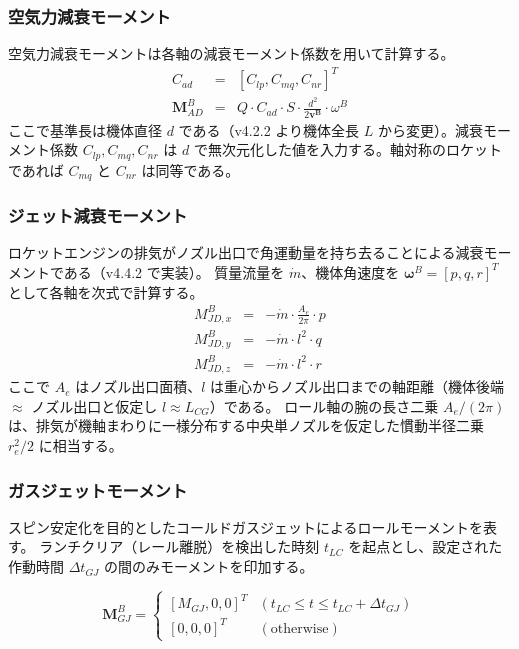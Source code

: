 ﻿\documentclass[a4paper]{jsarticle}
\begin{document}
\subsubsection{空気力減衰モーメント}
空気力減衰モーメントは各軸の減衰モーメント係数を用いて計算する。
\begin{eqnarray}
C_{ad} &=& [C_{lp}, C_{mq}, C_{nr}]^T \\
\bm{M}^B_{AD} &=& Q \cdot C_{ad} \cdot S \cdot \frac{d^2}{2 \bm{v^B}} \cdot \omega^B
\end{eqnarray}
ここで基準長は機体直径 $d$ である（v4.2.2 より機体全長 $L$ から変更）。減衰モーメント係数 $C_{lp}, C_{mq}, C_{nr}$ は $d$ で無次元化した値を入力する。軸対称のロケットであれば $C_{mq}$ と $C_{nr}$ は同等である。

\subsubsection{ジェット減衰モーメント}
ロケットエンジンの排気がノズル出口で角運動量を持ち去ることによる減衰モーメントである（v4.4.2 で実装）。
質量流量を $\dot{m}$、機体角速度を $\bm{\omega}^B = [p, q, r]^T$ として各軸を次式で計算する。
\begin{eqnarray}
M^B_{JD,x} &=& -\dot{m} \cdot \frac{A_e}{2\pi} \cdot p \\
M^B_{JD,y} &=& -\dot{m} \cdot l^2 \cdot q \\
M^B_{JD,z} &=& -\dot{m} \cdot l^2 \cdot r
\end{eqnarray}
ここで $A_e$ はノズル出口面積、$l$ は重心からノズル出口までの軸距離（機体後端 $\approx$ ノズル出口と仮定し $l \approx L_{CG}$）である。
ロール軸の腕の長さ二乗 $A_e/(2\pi)$ は、排気が機軸まわりに一様分布する中央単ノズルを仮定した慣動半径二乗 $r_e^2/2$ に相当する。

\subsubsection{ガスジェットモーメント}
スピン安定化を目的としたコールドガスジェットによるロールモーメントを表す。
ランチクリア（レール離脱）を検出した時刻 $t_{LC}$ を起点とし、設定された作動時間 $\Delta t_{GJ}$ の間のみモーメントを印加する。

\begin{equation}
\bm{M}^B_{GJ} =
\begin{cases}
[M_{GJ}, 0, 0]^T & (t_{LC} \leq t \leq t_{LC} + \Delta t_{GJ}) \\
[0, 0, 0]^T & (\text{otherwise})
\end{cases}
\end{equation}
\end{document}
